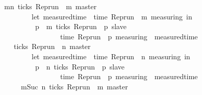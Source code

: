 \begin{isabellebody}
%
\isadelimproof
%
\endisadelimproof
%
\isatagproof
{}\isamarkupfalse%
\ {\isacharminus}\isanewline
\ \ \isamarkupfalse%
\ {\isacartoucheopen}{\isacharbraceleft}\ {\isasymrho}{\isachardot}\ {\isasymforall}m{\isasymge}n{\isachardot}\ ticks\ {\isacharparenleft}{\isacharparenleft}Rep{\isacharunderscore}run\ {\isasymrho}{\isacharparenright}\ m\ master{\isacharparenright}\ {\isasymlongrightarrow}\isanewline
\ \ \ \ \ \ \ \ \ \ \ \ \ \ \ {\isacharparenleft}let\ measured{\isacharunderscore}time\ {\isacharequal}\ time\ {\isacharparenleft}{\isacharparenleft}Rep{\isacharunderscore}run\ {\isasymrho}{\isacharparenright}\ m\ measuring{\isacharparenright}\ in\isanewline
\ \ \ \ \ \ \ \ \ \ \ \ \ \ \ \ {\isasymexists}p\ {\isasymge}\ m{\isachardot}\ ticks\ {\isacharparenleft}{\isacharparenleft}Rep{\isacharunderscore}run\ {\isasymrho}{\isacharparenright}\ p\ slave{\isacharparenright}\isanewline
\ \ \ \ \ \ \ \ \ \ \ \ \ \ \ \ \ \ \ \ \ \ {\isasymand}\ time\ {\isacharparenleft}{\isacharparenleft}Rep{\isacharunderscore}run\ {\isasymrho}{\isacharparenright}\ p\ measuring{\isacharparenright}\ {\isacharequal}\ measured{\isacharunderscore}time\ {\isacharplus}\ {\isasymdelta}{\isasymtau}{\isacharparenright}{\isacharbraceright}\isanewline
\ \ \ \ \ \ \ {\isacharequal}\ {\isacharbraceleft}\ {\isasymrho}{\isachardot}\ ticks\ {\isacharparenleft}{\isacharparenleft}Rep{\isacharunderscore}run\ {\isasymrho}{\isacharparenright}\ n\ master{\isacharparenright}\ {\isasymlongrightarrow}\isanewline
\ \ \ \ \ \ \ \ \ \ \ \ \ \ \ {\isacharparenleft}let\ measured{\isacharunderscore}time\ {\isacharequal}\ time\ {\isacharparenleft}{\isacharparenleft}Rep{\isacharunderscore}run\ {\isasymrho}{\isacharparenright}\ n\ measuring{\isacharparenright}\ in\isanewline
\ \ \ \ \ \ \ \ \ \ \ \ \ \ \ \ {\isasymexists}p\ {\isasymge}\ n{\isachardot}\ ticks\ {\isacharparenleft}{\isacharparenleft}Rep{\isacharunderscore}run\ {\isasymrho}{\isacharparenright}\ p\ slave{\isacharparenright}\isanewline
\ \ \ \ \ \ \ \ \ \ \ \ \ \ \ \ \ \ \ \ \ \ {\isasymand}\ time\ {\isacharparenleft}{\isacharparenleft}Rep{\isacharunderscore}run\ {\isasymrho}{\isacharparenright}\ p\ measuring{\isacharparenright}\ {\isacharequal}\ measured{\isacharunderscore}time\ {\isacharplus}\ {\isasymdelta}{\isasymtau}{\isacharparenright}{\isacharbraceright}\isanewline
\ \ \ \ \ \ \ \ \ {\isasyminter}\ {\isacharbraceleft}\ {\isasymrho}{\isachardot}\ {\isasymforall}m{\isasymge}Suc\ n{\isachardot}\ ticks\ {\isacharparenleft}{\isacharparenleft}Rep{\isacharunderscore}run\ {\isasymrho}{\isacharparenright}\ m\ master{\isacharparenright}\ {\isasymlongrightarrow}\isanewline

\end{isabellebody}
